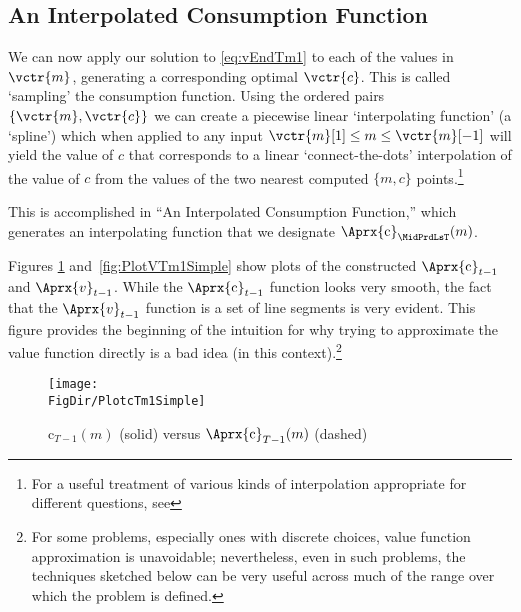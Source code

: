 \documentclass[titlepage, headings=optiontotocandhead]{Resources/texmf-local/tex/latex/econtex}
\begin{document}
\hypertarget{an-interpolated-consumption-function}{}
\subsection{An Interpolated Consumption Function} \label{subsec:LinInterp}

We can now apply our solution to \eqref{eq:vEndTm1} to each of the values in $\vctr{m}$, generating a corresponding optimal $\vctr{c}$.  This is called `sampling' the consumption function.  Using the ordered pairs $\{\vctr{m},\vctr{c}\}$ we can create a piecewise linear `interpolating function' (a `spline') which when applied to any input $\vctr{m}[1] \leq  m\leq \vctr{m}[-1]$ will yield the value of $c$ that corresponds to a linear `connect-the-dots' interpolation of the value of $c$ from the values of the two nearest computed $\{m,c\}$ points.\footnote{For a useful treatment of various kinds of interpolation appropriate for different questions, see } %

This is accomplished in ``An Interpolated Consumption Function,'' which generates an interpolating function that we designate $\Aprx{\mathrm{c}}_{\MidPrdLsT}(m)$. %

Figures \ref{fig:PlotcTm1Simple} and~\ref{fig:PlotVTm1Simple} show
plots of the constructed $\Aprx{\mathrm{c}}_{t-1}$ and $\Aprx{v}_{t-1}$. While the $\Aprx{\mathrm{c}}_{t-1}$ function looks very smooth, the fact that the $\Aprx{v}_{t-1}$ function is a set of line segments is very evident.  This figure provides the beginning of the intuition for why trying to approximate the value function directly is a bad idea (in this context).\footnote{For some problems, especially ones with discrete choices, value function approximation is unavoidable; nevertheless, even in such problems, the techniques sketched below can be very useful across much of the range over which the problem is defined.}

\hypertarget{PlotcTm1Simple}{}
\begin{figure}
  \centerline{\texttt{[image: \\FigDir/PlotcTm1Simple]}}
  \caption{$\mathrm{c}_{T-1}(m)$ (solid) versus $\Aprx{\mathrm{c}}_{T-1}(m)$ (dashed)}
  \label{fig:PlotcTm1Simple}
\end{figure}
\end{document}
